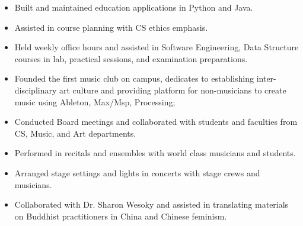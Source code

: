 \begin{itemize}
\item Built and maintained education applications in Python and Java.
\item Assisted in course planning with CS ethics emphasis.
\end{itemize}
\smallskip
{}
\begin{itemize}
\item Held weekly office hours and assisted in Software Engineering, Data Structure courses in lab, practical sessions, and examination preparations.
\end{itemize}
\smallskip
{}
\begin{itemize}
\item Founded the first music club on campus, dedicates to establishing inter-disciplinary art culture and providing platform for non-musicians to create music using Ableton, Max/Msp, Processing;
\item Conducted Board meetings and collaborated with students and faculties from CS, Music, and Art departments.
\end{itemize}
\smallskip
{}
\begin{itemize}
\item Performed in recitals and ensembles with world class musicians and students.
\item Arranged stage settings and lights in concerts with stage crews and musicians.
\end{itemize}
\smallskip
{}
\begin{itemize}
\item Collaborated with Dr. Sharon Wesoky and assisted in translating materials on Buddhist practitioners in China and Chinese feminism.
\end{itemize}
\smallskip



